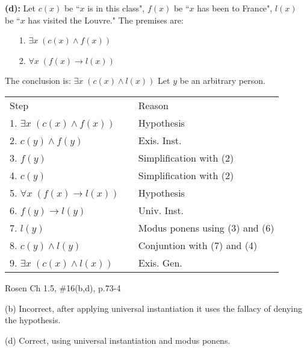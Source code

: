\documentclass[12pt]{exam}
\newenvironment{my_item}{
\begin{itemize}
    \setlength{\itemsep}{1pt}
    \setlength{\parskip}{0pt}
    \setlength{\parsep}{0pt}
}{\end{itemize}}
\begin{document}
\begin{questions}
\begin{solution}
    \medskip
    \textbf{(d):} Let $c(x)$ be ``$x$ is in this class", $f(x)$ be ``$x$ has been to France", $l(x)$ be ``$x$ has visited the Louvre." The premises are:
    \begin{itemize}
        \item[1.] $\exists x\;(c(x) \wedge f(x))$
        \item[2.] $\forall x\;(f(x) \rightarrow l(x))$
    \end{itemize}
    The conclusion is: $\exists x\; (c(x) \wedge l(x))$
    Let $y$ be an arbitrary person.

    \smallskip
    \begin{tabular}{lll}
        Step        & \hspace{0.2in} & Reason \\
        1. $\exists x\;(c(x) \wedge f(x))$      & & Hypothesis \\
        2. $c(y) \wedge f(y)$                   & & Exis. Inst. \\
        3. $f(y)$                               & & Simplification with (2) \\
        4. $c(y)$                               & & Simplification with (2) \\
        5. $\forall x\;(f(x) \rightarrow l(x))$ & & Hypothesis \\
        6. $f(y) \rightarrow l(y)$              & & Univ. Inst. \\
        7. $l(y)$                               & & Modus ponens using (3) and (6) \\
        8. $c(y) \wedge l(y)$                   & & Conjuntion with (7) and (4) \\
        9. $\exists x\; (c(x) \wedge l(x))$     & & Exis. Gen. \\
    \end{tabular}
    \end{solution}


\question Rosen Ch 1.5, \#16(b,d), p.73-4
    \begin{solution}
    \begin{my_item}
        \item[(b)] Incorrect, after applying universal instantiation it uses the fallacy of denying the hypothesis.
        \item[(d)] Correct, using universal instantiation and modus ponens.
    \end{my_item}
    \end{solution}

\end{questions}
\end{document}
